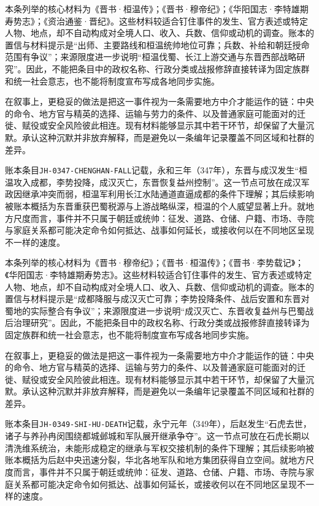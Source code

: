 本条列举的核心材料为《晋书·桓温传》；《晋书·穆帝纪》；《华阳国志·李特雄期寿势志》；《资治通鉴·晋纪》。这些材料较适合钉住事件的发生、官方表述或特定人物、地点，却不自动构成对全境人口、收入、兵数、信仰或动机的调查。账本的置信与材料提示是“出师、主要路线和桓温统帅地位可靠；兵数、补给和朝廷授命范围有争议”；来源限度进一步说明“桓温伐蜀、长江上游交通与东晋西部战略研究”。因此，不能把条目中的政权名称、行政分类或战报修辞直接转译为固定族群和统一社会意志，也不能将制度宣布写成各地同步实施。

在叙事上，更稳妥的做法是把这一事件视为一条需要地方中介才能运作的链：中央的命令、地方官与精英的选择、运输与劳力的条件、以及普通家庭可能面对的迁徙、赋役或安全风险彼此相连。现有材料能够显示其中若干环节，却保留了大量沉默。承认这种沉默并非放弃解释，而是避免以一条编年记录覆盖不同区域和社群的差异。

账本条目\texttt{JH-0347-CHENGHAN-FALL}记载，永和三年（347年），东晋与成汉发生“桓温攻入成都，李势投降，成汉灭亡，东晋恢复益州控制”。这一节点可放在成汉军政因继承冲突而弱，桓温军利用长江水陆通道直逼成都的条件下理解；其后续影响被账本概括为东晋重获巴蜀税源与上游战略纵深，桓温的个人威望显著上升。就地方尺度而言，事件并不只属于朝廷或统帅：征发、道路、仓储、户籍、市场、寺院与家庭关系都可能决定命令如何抵达、战事如何延长，或接收何以在不同地区呈现不一样的速度。

本条列举的核心材料为《晋书·穆帝纪》；《晋书·桓温传》；《晋书·李势载记》；《华阳国志·李特雄期寿势志》。这些材料较适合钉住事件的发生、官方表述或特定人物、地点，却不自动构成对全境人口、收入、兵数、信仰或动机的调查。账本的置信与材料提示是“成都降服与成汉灭亡可靠；李势投降条件、战后安置和东晋对蜀地的实际整合有争议”；来源限度进一步说明“成汉灭亡、东晋收复益州与巴蜀战后治理研究”。因此，不能把条目中的政权名称、行政分类或战报修辞直接转译为固定族群和统一社会意志，也不能将制度宣布写成各地同步实施。

在叙事上，更稳妥的做法是把这一事件视为一条需要地方中介才能运作的链：中央的命令、地方官与精英的选择、运输与劳力的条件、以及普通家庭可能面对的迁徙、赋役或安全风险彼此相连。现有材料能够显示其中若干环节，却保留了大量沉默。承认这种沉默并非放弃解释，而是避免以一条编年记录覆盖不同区域和社群的差异。

账本条目\texttt{JH-0349-SHI-HU-DEATH}记载，永宁元年（349年），后赵发生“石虎去世，诸子与养孙冉闵围绕都城邺城和军队展开继承争夺”。这一节点可放在石虎长期以清洗维系统治，未能形成稳定的继承与军权交接机制的条件下理解；其后续影响被账本概括为后赵中央迅速分裂，华北各地军队和地方集团获得自立空间。就地方尺度而言，事件并不只属于朝廷或统帅：征发、道路、仓储、户籍、市场、寺院与家庭关系都可能决定命令如何抵达、战事如何延长，或接收何以在不同地区呈现不一样的速度。

